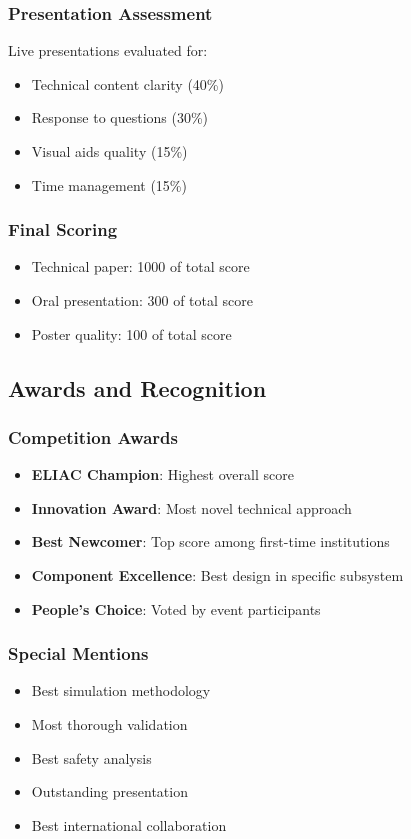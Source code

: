 \subsubsection{Presentation Assessment}
Live presentations evaluated for:
\begin{itemize}[noitemsep]
    \item Technical content clarity (40\%)
    \item Response to questions (30\%)
    \item Visual aids quality (15\%)
    \item Time management (15\%)
\end{itemize}

\subsubsection{Final Scoring}
\begin{itemize}[noitemsep]
    \item Technical paper: 1000 of total score
    \item Oral presentation: 300 of total score
    \item Poster quality: 100 of total score
\end{itemize}

\subsection{Awards and Recognition}

\subsubsection{Competition Awards}
\begin{itemize}[noitemsep]
    \item \textbf{ELIAC Champion}: Highest overall score
    \item \textbf{Innovation Award}: Most novel technical approach
    \item \textbf{Best Newcomer}: Top score among first-time institutions
    \item \textbf{Component Excellence}: Best design in specific subsystem
    \item \textbf{People's Choice}: Voted by event participants
\end{itemize}

\subsubsection{Special Mentions}
\begin{itemize}[noitemsep]
    \item Best simulation methodology
    \item Most thorough validation
    \item Best safety analysis
    \item Outstanding presentation
    \item Best international collaboration
\end{itemize}

